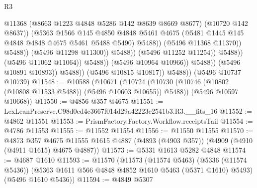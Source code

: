 \begin{lexlean}{R3}
\begin{coremodule}
                                                  @11368
                                                  (@8663 @1223 @4848 @5286 @142 @8639 @8669 @8677)
                                                  (@10720 @142 @8637))
                                                (@5363
                                                  @1566
                                                  @145
                                                  @4850
                                                  @4848
                                                  @5461
                                                  @4675
                                                  (@5481
                                                    @1445
                                                    @145
                                                    @4848
                                                    @4848
                                                    @4675
                                                    @5461
                                                    @5488
                                                    @5490)
                                                  @5488))
                                              (@5496 @11368 @11370))
                                            @5488))
                                        (@5496 @11298 @11300))
                                      @5488))
                                  (@5496 @11252 @11254))
                                @5488))
                            (@5496 @11062 @11064))
                          @5488))
                      (@5496 @10964 @10966))
                    @5488))
                (@5496 @10891 @10893))
              @5488))
          (@5496 @10815 @10817))
        @5488))
    (@5496 @10737 @10739)
@11548 := @10588
    (@10671
      (@10724 (@10730 (@10746 (@10802 (@10808 @11533 @5488)) (@5496 @10603 @10655)) @5488))
      (@5496 @10597 @10668))
@11550 := @4856 @357 @4675
@11551 := LexLeanPreserve.C98d0ed4c3667f014d29a42223e2541b3.R3.__fits_16
@11552 := @4862 @11551
@11553 := PrismFactory.Factory.Workflow.receiptsTail
@11554 := @4786 @11553
@11555 := @11552 @11554
@11556 := @11550 @11555
@11570 := @4873
    @357
    @4675
    @11555
    @1615
    @4887
    (@4893 (@4903 @357))
    (@4909 (@4910 (@4911 @1615) @4675 @4887))
@11573 := @5331 @1613 @5282 @4848
@11574 := @4687 @1610
@11593 := @11570
    (@11573
      (@11574 @5463)
      (@5336 (@11574 @5436))
      (@5363 @1611 @566 @4848 @4852 @1610 @5463 (@5371 @1610) @5493)
      (@5496 @1610 @5436))
@11594 := @4849 @5307

\end{coremodule}
\end{lexlean}

